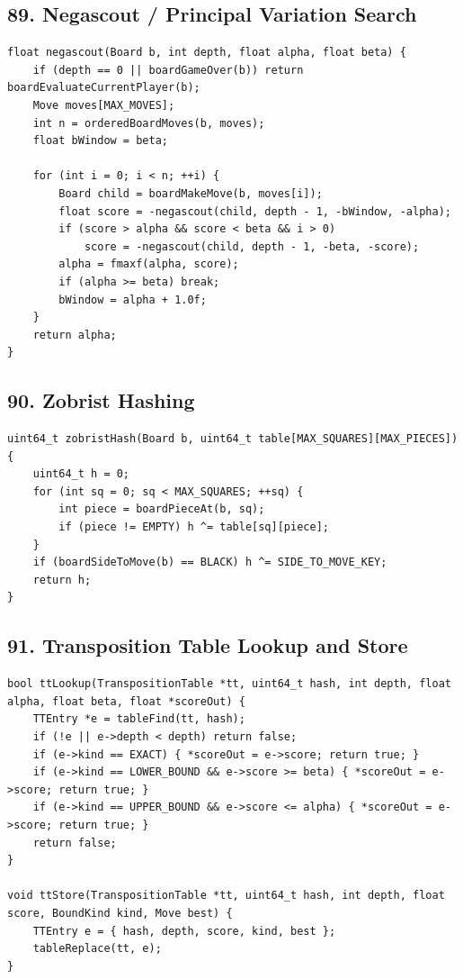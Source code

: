 \documentclass[10pt,letterpaper]{article}
\begin{document}
\subsection*{89. Negascout / Principal Variation Search}
{}

\begin{verbatim}
float negascout(Board b, int depth, float alpha, float beta) {
    if (depth == 0 || boardGameOver(b)) return boardEvaluateCurrentPlayer(b);
    Move moves[MAX_MOVES];
    int n = orderedBoardMoves(b, moves);
    float bWindow = beta;

    for (int i = 0; i < n; ++i) {
        Board child = boardMakeMove(b, moves[i]);
        float score = -negascout(child, depth - 1, -bWindow, -alpha);
        if (score > alpha && score < beta && i > 0)
            score = -negascout(child, depth - 1, -beta, -score);
        alpha = fmaxf(alpha, score);
        if (alpha >= beta) break;
        bWindow = alpha + 1.0f;
    }
    return alpha;
}
\end{verbatim}

\subsection*{90. Zobrist Hashing}
{}

\begin{verbatim}
uint64_t zobristHash(Board b, uint64_t table[MAX_SQUARES][MAX_PIECES]) {
    uint64_t h = 0;
    for (int sq = 0; sq < MAX_SQUARES; ++sq) {
        int piece = boardPieceAt(b, sq);
        if (piece != EMPTY) h ^= table[sq][piece];
    }
    if (boardSideToMove(b) == BLACK) h ^= SIDE_TO_MOVE_KEY;
    return h;
}
\end{verbatim}

\subsection*{91. Transposition Table Lookup and Store}
{}

\begin{verbatim}
bool ttLookup(TranspositionTable *tt, uint64_t hash, int depth, float alpha, float beta, float *scoreOut) {
    TTEntry *e = tableFind(tt, hash);
    if (!e || e->depth < depth) return false;
    if (e->kind == EXACT) { *scoreOut = e->score; return true; }
    if (e->kind == LOWER_BOUND && e->score >= beta) { *scoreOut = e->score; return true; }
    if (e->kind == UPPER_BOUND && e->score <= alpha) { *scoreOut = e->score; return true; }
    return false;
}

void ttStore(TranspositionTable *tt, uint64_t hash, int depth, float score, BoundKind kind, Move best) {
    TTEntry e = { hash, depth, score, kind, best };
    tableReplace(tt, e);
}
\end{verbatim}
\end{document}
